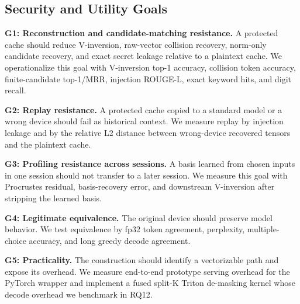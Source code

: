 \subsection{Security and Utility Goals}

\textbf{G1: Reconstruction and candidate-matching resistance.} A protected cache should reduce V-inversion, raw-vector collision recovery, norm-only candidate recovery, and exact secret leakage relative to a plaintext cache. We operationalize this goal with V-inversion top-1 accuracy, collision token accuracy, finite-candidate top-1/MRR, injection ROUGE-L, exact keyword hits, and digit recall.

\textbf{G2: Replay resistance.} A protected cache copied to a standard model or a wrong device should fail as historical context. We measure replay by injection leakage and by the relative L2 distance between wrong-device recovered tensors and the plaintext cache.

\textbf{G3: Profiling resistance across sessions.} A basis learned from chosen inputs in one session should not transfer to a later session. We measure this goal with Procrustes residual, basis-recovery error, and downstream V-inversion after stripping the learned basis.

\textbf{G4: Legitimate equivalence.} The original device should preserve model behavior. We test equivalence by fp32 token agreement, perplexity, multiple-choice accuracy, and long greedy decode agreement.

\textbf{G5: Practicality.} The construction should identify a vectorizable path and expose its overhead. We measure end-to-end prototype serving overhead for the PyTorch wrapper and implement a fused split-K Triton de-masking kernel whose decode overhead we benchmark in RQ12.
